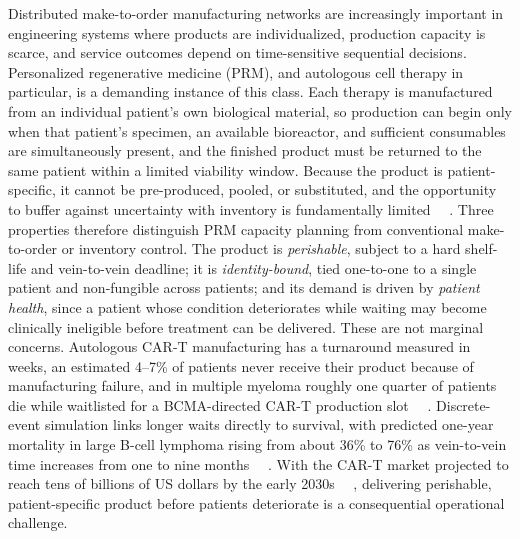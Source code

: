 \documentclass[preprint,review,12pt,nonatbib]{elsarticle}
\providecommand{\DIFadd}[1]{{\protect\color{blue}#1}} %
\providecommand{\DIFdel}[1]{} %
\providecommand{\DIFaddbegin}{} %
\providecommand{\DIFaddend}{} %
\providecommand{\DIFdelbegin}{} %
\providecommand{\DIFdelend}{} %
\providecommand{\DIFscaledelfig}{0.5}
\newlength{\DIFdelgraphicswidth} %
\newlength{\DIFdelgraphicsheight} %
\providecommand{\DIFaddincludegraphics}[2][]{{\color{blue}\fbox{\DIFOincludegraphics[#1]{#2}}}} %
\providecommand{\DIFdelincludegraphics}[2][]{%
\sbox{\DIFdelgraphicsbox}{\DIFOincludegraphics[#1]{#2}}%
\settoboxwidth{\DIFdelgraphicswidth}{\DIFdelgraphicsbox} %
\settoboxtotalheight{\DIFdelgraphicsheight}{\DIFdelgraphicsbox} %
\scalebox{\DIFscaledelfig}{%
\parbox[b]{\DIFdelgraphicswidth}{\usebox{\DIFdelgraphicsbox}\\[-\baselineskip] \rule{\DIFdelgraphicswidth}{0em}}\llap{\resizebox{\DIFdelgraphicswidth}{\DIFdelgraphicsheight}{%
\setlength{\unitlength}{\DIFdelgraphicswidth}%
\begin{picture}(1,1)%
\thicklines\linethickness{2pt} %
{\color[rgb]{1,0,0}\put(0,0){\framebox(1,1){}}}%
{\color[rgb]{1,0,0}\put(0,0){\line( 1,1){1}}}%
{\color[rgb]{1,0,0}\put(0,1){\line(1,-1){1}}}%
\end{picture}%
}\hspace*{3pt}}} %
} %
\DeclareRobustCommand{\DIFaddbegin}{\DIFOaddbegin \let\includegraphics\DIFaddincludegraphics} %
\DeclareRobustCommand{\DIFaddend}{\DIFOaddend \let\includegraphics\DIFOincludegraphics} %
\DeclareRobustCommand{\DIFdelbegin}{\DIFOdelbegin \let\includegraphics\DIFdelincludegraphics} %
\DeclareRobustCommand{\DIFdelend}{\DIFOaddend \let\includegraphics\DIFOincludegraphics} %
\begin{document}
Distributed make-to-order manufacturing networks are increasingly important in engineering systems where products are individualized, production capacity is \DIFdelbegin \DIFdel{limited}\DIFdelend \DIFaddbegin \DIFadd{scarce}\DIFaddend , and service outcomes depend on time-sensitive \DIFdelbegin \DIFdel{operational }\DIFdelend \DIFaddbegin \DIFadd{sequential }\DIFaddend decisions. Personalized regenerative medicine (PRM), \DIFdelbegin \DIFdel{including }\DIFdelend \DIFaddbegin \DIFadd{and }\DIFaddend autologous cell therapy \DIFaddbegin \DIFadd{in particular}\DIFaddend , is a \DIFdelbegin \DIFdel{representative example. In this setting, manufacturing cannot begin until a patient}\DIFdelend \DIFaddbegin \DIFadd{demanding instance of this class. Each therapy is manufactured from an individual patient's own biological material, so production can begin only when that patient's }\DIFaddend specimen, an \DIFdelbegin \DIFdel{idle }\DIFdelend \DIFaddbegin \DIFadd{available }\DIFaddend bioreactor, and sufficient consumables are simultaneously \DIFdelbegin \DIFdel{available. Because products are }\DIFdelend \DIFaddbegin \DIFadd{present, and the finished product must be returned to the same patient within a limited viability window. Because the product is }\DIFaddend patient-specific\DIFdelbegin \DIFdel{and cannot be produced in advance, the system faces high demand uncertainty , limitedopportunities for pooling inventory , and substantial risk from disruptions in the supply of critical materials}\DIFdelend \DIFaddbegin \DIFadd{, it cannot be pre-produced, pooled, or substituted, and the opportunity to buffer against uncertainty with inventory is fundamentally limited~\mbox{%
\cite{Wang2023SimulationBased, Zheng2022HybridMBRL}}\hskip0pt%
. Three properties therefore distinguish PRM capacity planning from conventional make-to-order or inventory control. The product is }\emph{\DIFadd{perishable}}\DIFadd{, subject to a hard shelf-life and vein-to-vein deadline; it is }\emph{\DIFadd{identity-bound}}\DIFadd{, tied one-to-one to a single patient and non-fungible across patients; and its demand is driven by }\emph{\DIFadd{patient health}}\DIFadd{, since a patient whose condition deteriorates while waiting may become clinically ineligible before treatment can be delivered. These are not marginal concerns. Autologous CAR-T manufacturing has a turnaround measured in weeks, an estimated 4--7\% of patients never receive their product because of manufacturing failure, and in multiple myeloma roughly one quarter of patients die while waitlisted for a BCMA-directed CAR-T production slot~\mbox{%
\cite{AyalaCeja2024CARTManufacturing}}\hskip0pt%
. Discrete-event simulation links longer waits directly to survival, with predicted one-year mortality in large B-cell lymphoma rising from about 36\% to 76\% as vein-to-vein time increases from one to nine months~\mbox{%
\cite{Tully2019WaitTimes}}\hskip0pt%
. With the CAR-T market projected to reach tens of billions of US dollars by the early 2030s~\mbox{%
\cite{GrandView2024CART}}\hskip0pt%
, delivering perishable, patient-specific product before patients deteriorate is a consequential operational challenge}\DIFaddend .
\end{document}
